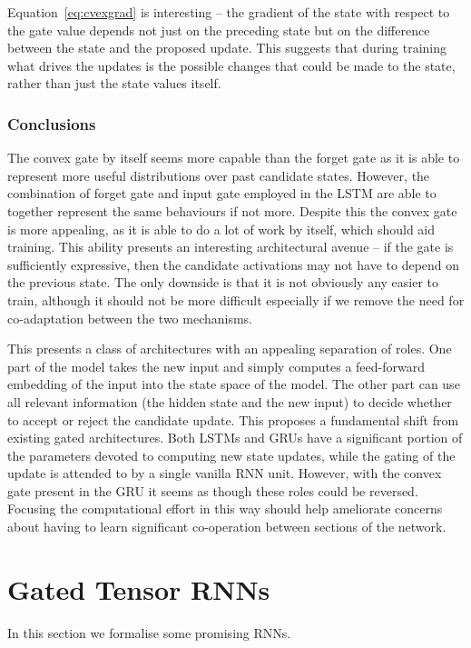 Equation~\eqref{eq:cvexgrad} is interesting -- the gradient of the state with respect to the gate value
depends not just on the preceding state but on the difference between the state and the proposed
update. This suggests that during training what drives the updates is the possible changes that could be
made to the state, rather than just the state values itself.

\subsubsection{Conclusions}
The convex gate by itself seems more capable than the forget gate as it is able to represent more
useful distributions over past candidate states. However, the combination of forget gate and input
gate employed in the LSTM are able to together represent the same behaviours if not more. Despite this
the convex gate is more appealing, as it is able to do a lot of work by itself, which should aid
training.
This ability presents an interesting architectural avenue -- if the gate is sufficiently
expressive, then the candidate activations may not have to depend on the previous state. The
only downside is that it is not obviously any easier to train, although it should not be more
difficult especially if we remove the need for co-adaptation between the two mechanisms.

This presents a class of architectures with an appealing separation of roles. One part
of the model takes the new input and simply computes a feed-forward embedding of the input into
the state space of the model. The other part can use all relevant information (the hidden state
and the new input) to decide whether to accept or reject the candidate update. This proposes
a fundamental shift from existing gated architectures. Both LSTMs and GRUs have a significant
portion of the parameters devoted to computing new state updates, while the gating of the update
is attended to by a single vanilla RNN unit. However, with the convex gate present in the GRU
it seems as though these roles could be reversed. Focusing the computational effort in this way
should help ameliorate concerns about having to learn significant co-operation
between sections of the network.

\section{Gated Tensor RNNs}
In this section we formalise some promising RNNs.

